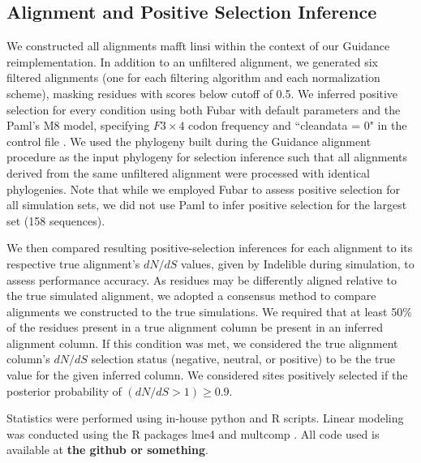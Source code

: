\documentclass[10pt]{article}
\begin{document}
\subsection*{Alignment and Positive Selection Inference}
We constructed all alignments mafft linsi \citep{Katoh2002,Katoh2005} within the context of our Guidance reimplementation. In addition to an unfiltered alignment, we generated six filtered alignments (one for each filtering algorithm and each normalization scheme), masking residues with scores below cutoff of 0.5. We inferred positive selection for every condition using both Fubar \citep{Murrell2013} with default parameters and the Paml's M8 model, specifying $F3\times4$ codon frequency and ``cleandata = 0" in the control file \citep{Yang2007}. We used the phylogeny built during the Guidance alignment procedure as the input phylogeny for selection inference such that all alignments derived from the same unfiltered alignment were processed with identical phylogenies. Note that while we employed Fubar to assess positive selection for all simulation sets, we did not use Paml to infer positive selection for the largest set (158 sequences).

We then compared resulting positive-selection inferences for each alignment to its respective true alignment's $dN/dS$ values, given by Indelible during simulation, to assess performance accuracy. As residues may be differently aligned relative to the true simulated alignment, we adopted a consensus method to compare alignments we constructed to the true simulations. We required that at least 50\% of the residues present in a true alignment column be present in an inferred alignment column. If this condition was met, we considered the true alignment column’s $dN/dS$  selection status (negative, neutral, or positive) to be the true value for the given inferred column. We considered sites positively selected if the posterior probability of $(dN/dS>1) \geq 0.9$.

Statistics were performed using in-house python and R scripts. Linear modeling was conducted using the R packages lme4 \citep{Bates2012} and
multcomp \citep{Hothorn2008}. All code used is available at \textbf{the github or something}.
\end{document}
